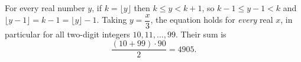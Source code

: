 For every real number $y$, if $k=\lfloor y\rfloor$ then $k\le y<k+1$, so $k-1\le y-1<k$ and $\lfloor y-1\rfloor=k-1=\lfloor y\rfloor-1$. Taking $y=\dfrac x3$, the equation holds for \emph{every} real $x$, in particular for all two-digit integers $10,11,\dots,99$. Their sum is
\[\dfrac{(10+99)\cdot90}{2}=\boxed{4905}.\]
